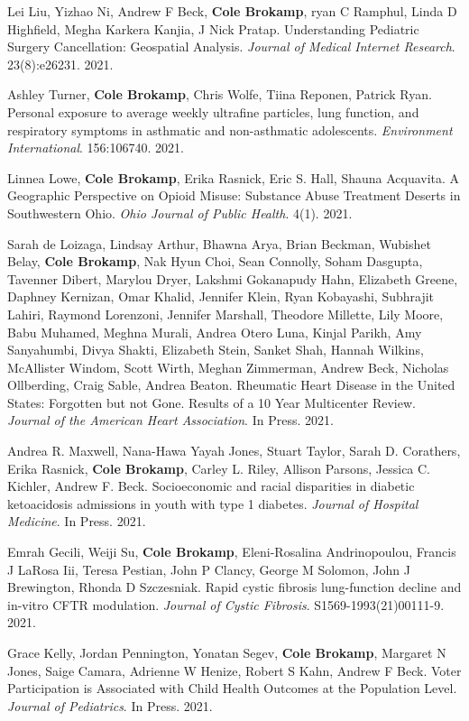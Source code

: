 Lei Liu, Yizhao Ni, Andrew F Beck, \textbf{Cole Brokamp}, ryan C
Ramphul, Linda D Highfield, Megha Karkera Kanjia, J Nick Pratap.
Understanding Pediatric Surgery Cancellation: Geospatial Analysis.
\emph{Journal of Medical Internet Research}. 23(8):e26231. 2021.

Ashley Turner, \textbf{Cole Brokamp}, Chris Wolfe, Tiina Reponen,
Patrick Ryan. Personal exposure to average weekly ultrafine particles,
lung function, and respiratory symptoms in asthmatic and non-asthmatic
adolescents. \emph{Environment International}. 156:106740. 2021.

Linnea Lowe, \textbf{Cole Brokamp}, Erika Rasnick, Eric S. Hall, Shauna
Acquavita. A Geographic Perspective on Opioid Misuse: Substance Abuse
Treatment Deserts in Southwestern Ohio. \emph{Ohio Journal of Public
Health}. 4(1). 2021.

Sarah de Loizaga, Lindsay Arthur, Bhawna Arya, Brian Beckman, Wubishet
Belay, \textbf{Cole Brokamp}, Nak Hyun Choi, Sean Connolly, Soham
Dasgupta, Tavenner Dibert, Marylou Dryer, Lakshmi Gokanapudy Hahn,
Elizabeth Greene, Daphney Kernizan, Omar Khalid, Jennifer Klein, Ryan
Kobayashi, Subhrajit Lahiri, Raymond Lorenzoni, Jennifer Marshall,
Theodore Millette, Lily Moore, Babu Muhamed, Meghna Murali, Andrea Otero
Luna, Kinjal Parikh, Amy Sanyahumbi, Divya Shakti, Elizabeth Stein,
Sanket Shah, Hannah Wilkins, McAllister Windom, Scott Wirth, Meghan
Zimmerman, Andrew Beck, Nicholas Ollberding, Craig Sable, Andrea Beaton.
Rheumatic Heart Disease in the United States: Forgotten but not Gone.
Results of a 10 Year Multicenter Review. \emph{Journal of the American
Heart Association}. In Press. 2021.

Andrea R. Maxwell, Nana-Hawa Yayah Jones, Stuart Taylor, Sarah D.
Corathers, Erika Rasnick, \textbf{Cole Brokamp}, Carley L. Riley,
Allison Parsons, Jessica C. Kichler, Andrew F. Beck. Socioeconomic and
racial disparities in diabetic ketoacidosis admissions in youth with
type 1 diabetes. \emph{Journal of Hospital Medicine}. In Press. 2021.

Emrah Gecili, Weiji Su, \textbf{Cole Brokamp}, Eleni-Rosalina
Andrinopoulou, Francis J LaRosa Iii, Teresa Pestian, John P Clancy,
George M Solomon, John J Brewington, Rhonda D Szczesniak. Rapid cystic
fibrosis lung-function decline and in-vitro CFTR modulation.
\emph{Journal of Cystic Fibrosis}. S1569-1993(21)00111-9. 2021.

Grace Kelly, Jordan Pennington, Yonatan Segev, \textbf{Cole Brokamp},
Margaret N Jones, Saige Camara, Adrienne W Henize, Robert S Kahn, Andrew
F Beck. Voter Participation is Associated with Child Health Outcomes at
the Population Level. \emph{Journal of Pediatrics}. In Press. 2021.

